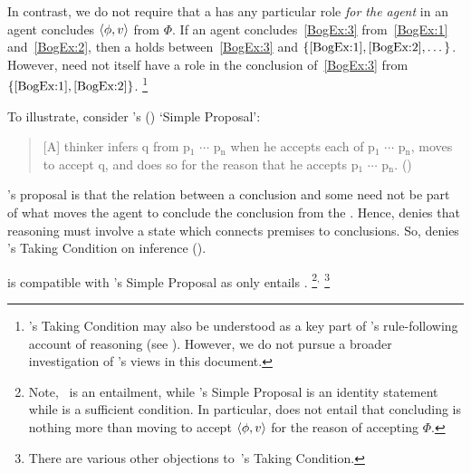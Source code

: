 \begin{note}
  In contrast, we do not require that a \fingfr{} has any particular role \emph{for the agent} in  an agent concludes \(\langle\phi, v\rangle\) from \(\Phi\).
  If an agent concludes~\ref{BogEx:3} from~\ref{BogEx:1} and~\ref{BogEx:2}, then a \fingfr{} holds between~\ref{BogEx:3} and \(\{\ref{BogEx:1}, \ref{BogEx:2}, \dots\}\).
  However, \fingfb{\ref{BogEx:3}}{\(\{\ref{BogEx:1}, \ref{BogEx:2}, \dots\}\)} need not itself have a role in the \agents{} conclusion of~\ref{BogEx:3} from \(\{\ref{BogEx:1}, \ref{BogEx:2}\}\).%
  \footnote{
    \citeauthor{Boghossian:2008vf}'s Taking Condition may also be understood as a key part of \citeauthor{Boghossian:2008vf}'s rule-following account of reasoning (see \textcite{Boghossian:2008vf,Boghossian:2012vb}).
    However, we do not pursue a broader investigation of \citeauthor{Boghossian:2008vf}'s views in this document.
  }

  \label{wrightSimp}%
  To illustrate, consider \citeauthor{Wright:2014tt}'s (\citeyear{Wright:2014tt}) `Simple Proposal':
  \begin{quote}
    [A] thinker infers q from p\(_{1}\) \(\cdots\) p\(_{\text{n}}\) when he accepts each of p\(_{1}\) \(\cdots\) p\(_{\text{n}}\), moves to accept q, and does so for the reason that he accepts p\(_{1}\) \(\cdots\) p\(_{\text{n}}\).%
    \mbox{}\hfill\mbox{(\citeyear[33]{Wright:2014tt})}
  \end{quote}
  \citeauthor{Wright:2014tt}'s proposal is that the relation between a conclusion and some \pool{} need not be part of what moves the agent to conclude the conclusion from the \pool{}.
  Hence, \citeauthor{Wright:2014tt} denies that reasoning must involve a state which connects premises to conclusions.
  So, \citeauthor{Wright:2014tt} denies \citeauthor{Boghossian:2008vf}'s Taking Condition on inference  (\citeyear[Cf.][33-34]{Wright:2014tt}).

  \supportI{} is compatible with \citeauthor{Wright:2014tt}'s Simple Proposal as \supportI{} only entails .%
  \footnote{
    Note,~\supportI{} is an entailment, while \citeauthor{Wright:2014tt}'s Simple Proposal is an identity statement while \supportI{} is a sufficient condition.
    In particular, \supportI{} does not entail that concluding is nothing more than moving to accept \(\langle\phi, v\rangle\) for the reason of accepting \(\Phi\).
  }\(^{,}\)%
  \footnote{
    There are various other objections to~\citeauthor{Boghossian:2014aa}'s Taking Condition.

}
\end{note}
